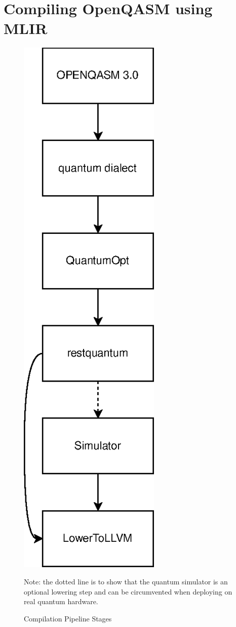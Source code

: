 \chapter{Compiling OpenQASM using MLIR}

\begin{figure}[ht]
    \centering
    \includegraphics{images/pipeline.eps}
    \caption[caption]{Compilation Pipeline Stages}
    \medskip
    \small
    Note: the dotted line is to show that the quantum simulator
    is an optional lowering step and can be circumvented when deploying on
    real quantum hardware.
    \label{fig:compilation_pipeline}

\end{figure}

